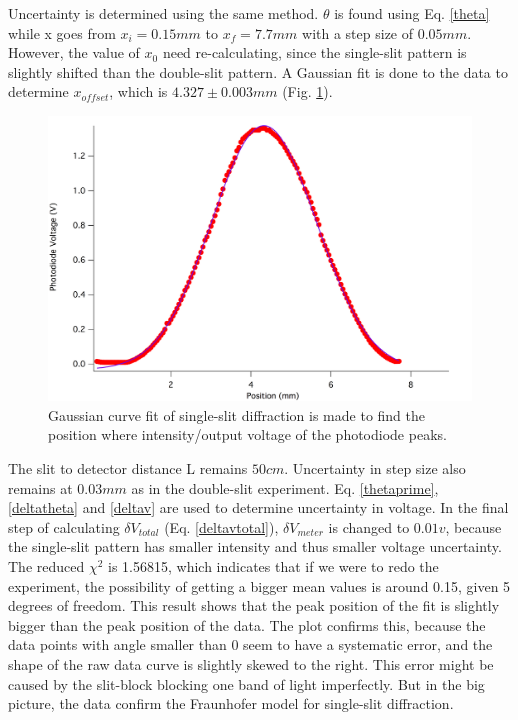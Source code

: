 \documentclass[prb,preprint]{revtex4-1}
\begin{document}
Uncertainty is determined using the same method. $\theta$ is found using Eq. \ref{theta} while x goes from $x_i = 0.15mm$ to $x_f = 7.7mm$ with a step size of $0.05mm$. However, the value of $x_0$ need re-calculating, since the single-slit pattern is slightly shifted than the double-slit pattern. A Gaussian fit is done to the data to determine $x_{offset}$, which is $4.327 \pm 0.003mm$ (Fig. \ref{gasfit2}).\\

\begin{figure}[h]
\centering
\includegraphics[width=7in]{singlegaus.png}
\caption{Gaussian curve fit of single-slit diffraction is made to find the position where intensity/output voltage of the photodiode peaks.}
\label{gasfit2}
\end{figure}

The slit to detector distance L remains $50 cm$. Uncertainty in step size also remains at $0.03mm$ as in the double-slit experiment. Eq. \ref{thetaprime}, \ref{deltatheta} and \ref{deltav} are used to determine uncertainty in voltage. In the final step of calculating $\delta V_{total}$ (Eq. \ref{deltavtotal}), $\delta V_{meter}$ is changed to $0.01v$, because the single-slit pattern has smaller intensity and thus smaller voltage uncertainty.\\

The reduced $\chi^2$ is 1.56815, which indicates that if we were to redo the experiment, the possibility of getting a bigger mean values is around 0.15, given 5 degrees of freedom. This result shows that the peak position of the fit is slightly bigger than the peak position of the data. The plot confirms this, because the data points with angle smaller than 0 seem to have a systematic error, and the shape of the raw data curve is slightly skewed to the right. This error might be caused by the slit-block blocking one band of light imperfectly. But in the big picture, the data confirm the Fraunhofer model for single-slit diffraction.\\
\end{document}
